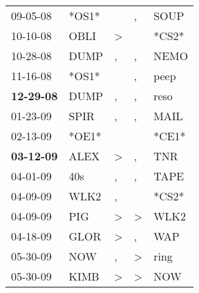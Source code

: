 \begin{supertabular}{p{0.07\textwidth}p{0.06\textwidth}p{0.02\textwidth}p{0.02\textwidth}p{0.06\textwidth}}
          09-05-08\textsuperscript{} &                            *OS1* &                  &                , &           SOUP\textsuperscript{} \\
          10-10-08\textsuperscript{} &           OBLI\textsuperscript{} &     \textgreater &                  &                            *CS2* \\
          10-28-08\textsuperscript{} &           DUMP\textsuperscript{} &                , &                , &           NEMO\textsuperscript{} \\
          11-16-08\textsuperscript{} &                            *OS1* &                  &                , &           peep\textsuperscript{} \\
 \textbf{12-29-08\textsuperscript{}} &           DUMP\textsuperscript{} &                , &                , &           reso\textsuperscript{} \\
          01-23-09\textsuperscript{} &           SPIR\textsuperscript{} &                , &                , &           MAIL\textsuperscript{} \\
          02-13-09\textsuperscript{} &                            *OE1* &                  &                  &                            *CE1* \\
 \textbf{03-12-09\textsuperscript{}} &           ALEX\textsuperscript{} &     \textgreater &                , &            TNR\textsuperscript{} \\
          04-01-09\textsuperscript{} &            40s\textsuperscript{} &                , &                , &           TAPE\textsuperscript{} \\
          04-09-09\textsuperscript{} &           WLK2\textsuperscript{} &                , &                  &                            *CS2* \\
          04-09-09\textsuperscript{} &            PIG\textsuperscript{} &     \textgreater &     \textgreater &           WLK2\textsuperscript{} \\
          04-18-09\textsuperscript{} &           GLOR\textsuperscript{} &     \textgreater &                , &            WAP\textsuperscript{} \\
          05-30-09\textsuperscript{} &            NOW\textsuperscript{} &                , &     \textgreater &           ring\textsuperscript{} \\
          05-30-09\textsuperscript{} &           KIMB\textsuperscript{} &     \textgreater &     \textgreater &            NOW\textsuperscript{} \\

\end{supertabular}
